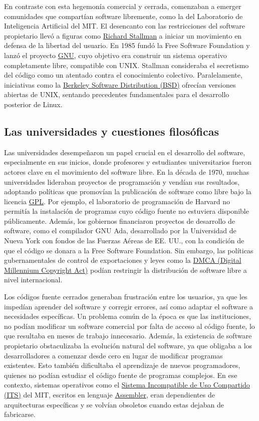 \documentclass[a4paper,12pt]{article}
\begin{document}
En contraste con esta hegemonía comercial y cerrada, comenzaban a emerger
comunidades que compartían software libremente, como la del Laboratorio de
Inteligencia Artificial del MIT. El desencanto con las restricciones del
software propietario llevó a figuras como \hyperlink{stallman}{Richard Stallman} a iniciar un
movimiento en defensa de la libertad del usuario. En 1985 fundó la Free Software
Foundation y lanzó el proyecto \hyperlink{gnu}{GNU}, cuyo objetivo era construir un sistema
operativo completamente libre, compatible con UNIX. Stallman consideraba el
secretismo del código como un atentado contra el conocimiento colectivo.
Paralelamente, iniciativas como la \hyperlink{bsd}{Berkeley Software Distribution (BSD)} ofrecían
versiones abiertas de UNIX, sentando precedentes fundamentales para el
desarrollo posterior de Linux.

\subsection{Las universidades y cuestiones filosóficas} Las universidades
desempeñaron un papel crucial en el desarrollo del software, especialmente en
sus inicios, donde profesores y estudiantes universitarios fueron actores clave
en el movimiento del software libre. En la década de 1970, muchas universidades
lideraban proyectos de programación y vendían sus resultados, adoptando
políticas que promovían la publicación de software como libre bajo la licencia
\hyperlink{gpl}{GPL}. Por ejemplo, el laboratorio de programación de Harvard no
permitía la instalación de programas cuyo código fuente no estuviera disponible
públicamente. Además, los gobiernos financiaron proyectos de desarrollo de
software, como el compilador GNU Ada, desarrollado por la Universidad de Nueva
York con fondos de las Fuerzas Aéreas de EE. UU., con la condición de que el
código se donara a la Free Software Foundation. Sin embargo, las políticas
gubernamentales de control de exportaciones y leyes como la \hyperlink{dmca}{DMCA
(Digital Millennium Copyright Act)} podían restringir la distribución de
software libre a nivel internacional.

Los códigos fuente cerrados generaban frustración entre los usuarios, ya que les
impedían aprender del software y corregir errores, así como adaptar el software
a necesidades específicas. Un problema común de la época es que las
instituciones, no podían modificar un software comercial por falta de acceso al
código fuente, lo que resultaba en meses de trabajo innecesario. Además, la
existencia de software propietario obstaculizaba la evolución natural del
software, ya que obligaba a los desarrolladores a comenzar desde cero en lugar
de modificar programas existentes. Esto también dificultaba el aprendizaje de
nuevos programadores, quienes no podían estudiar el código fuente de programas
complejos. En ese contexto, sistemas operativos como el \hyperlink{its}{Sistema
Incompatible de Uso Compartido (ITS)} del MIT, escritos en lenguaje
\hyperlink{assembler}{Assembler}, eran dependientes de arquitecturas específicas
y se volvían obsoletos cuando estas dejaban de fabricarse. 
\end{document}
